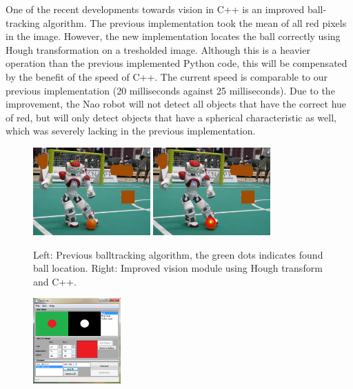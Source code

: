 \documentclass[11pt]{article}
\begin{document}
One of the recent developments towards vision in C++ is an improved ball-tracking algorithm. The previous implementation took the mean of all red pixels in the image. However, the new implementation locates the ball correctly using Hough transformation on a tresholded image. Although this is a heavier operation than the previous implemented Python code, this will be compensated by the benefit of the speed of C++. The current speed is comparable to our previous implementation (20 milliseconds against 25 milliseconds). Due to the improvement, the Nao robot will not detect all objects that have the correct hue of red, but will only detect objects that have a spherical characteristic as well, which was severely lacking in the previous implementation.
\begin{figure}[!ht]
  \centering
  \includegraphics[width=0.4\textwidth]{bal2.png}
  \includegraphics[width=0.4\textwidth]{bal.png}
  \caption{Left: Previous balltracking algorithm, the green dots indicates found ball location. Right: Improved vision module using Hough transform and C++.}
\label{fig:balls}
\end{figure}
\begin{figure}
  \begin{center}
    \vspace{0.5cm}
    \includegraphics[width=0.3\textwidth]{testsuite.png}
  \end{center}
\end{figure}
\end{document}
